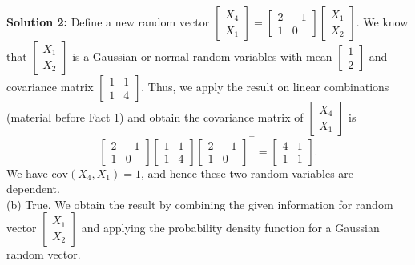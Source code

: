 \documentclass[letterpaper]{article}
\begin{document}
\textbf{Solution 2:}
Define a new random vector $\begin{bmatrix}X_4 \\ X_{1}\end{bmatrix}=\begin{bmatrix} 2& -1\\  1& 0\end{bmatrix} \begin{bmatrix}X_1 \\
X_{2}\end{bmatrix}$. We know that $\left[ \begin{array}{r} X_1\\  X_2\end{array}\right]$ is a Gaussian or normal random variables with mean $\begin{bmatrix}1\\ 2\end{bmatrix}$ and covariance matrix $\begin{bmatrix}1 & 1\\ 1&4\end{bmatrix}$. Thus,  we apply the result on linear combinations (material before Fact 1) and obtain the covariance matrix of $\begin{bmatrix}X_4 \\
X_{1}\end{bmatrix}$ is
\begin{equation*}
  \begin{bmatrix} 2& -1\\  1& 0\end{bmatrix}\begin{bmatrix}1 & 1\\ 1&4\end{bmatrix} \begin{bmatrix} 2& -1\\  1& 0\end{bmatrix}^\top
  =\begin{bmatrix} 4& 1\\  1& 1\end{bmatrix}.
\end{equation*}
We have $\mathrm{cov}(X_4, X_1)=1$, and hence these two random variables are dependent.\\

(b) True. We obtain the result by combining the given information for random vector $\left[ \begin{array}{r} X_1\\  X_2\end{array}\right]$ and applying the probability density function for a Gaussian random vector.\\
\end{document}
